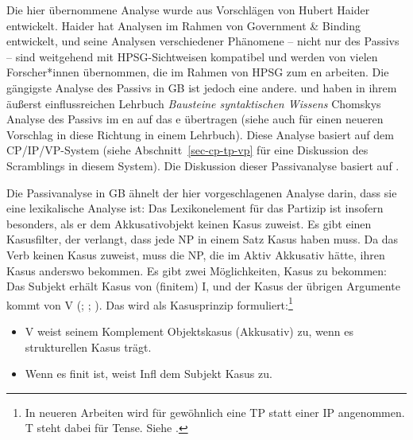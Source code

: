 Die hier übernommene Analyse wurde aus Vorschlägen von Hubert Haider
\citeyearpar{Haider86} entwickelt. Haider hat Analysen im Rahmen von Government \& Binding
\citep{Chomsky81a} entwickelt, und seine Analysen verschiedener Phänomene -- nicht nur des Passivs -- sind weitgehend mit HPSG-Sichtweisen kompatibel und werden
von vielen Forscher*innen übernommen, die im Rahmen von HPSG zum en arbeiten. Die gängigste Analyse des
Passivs in GB ist jedoch eine andere. \textcites[155--157]{Grewendorf88a}[]{Grewendorf93} und
\citet[462--463]{SS88a} haben in ihrem äußerst einflussreichen Lehrbuch \emph{Bausteine syntaktischen Wissens} Chomskys Analyse des Passivs im
en \citep[]{Chomsky81a} auf das e übertragen (siehe auch \citealt[]{Lohnstein2014a} für einen
neueren Vorschlag in diese Richtung in einem Lehrbuch). Diese Analyse basiert auf dem CP/IP/VP-System (siehe Abschnitt~\ref{sec-cp-tp-vp} für eine Diskussion des
Scramblings in diesem System). Die Diskussion dieser Passivanalyse basiert auf .

Die Passivanalyse in GB ähnelt der hier vorgeschlagenen Analyse darin, dass sie eine lexikalische Analyse ist:
Das Lexikonelement für das Partizip ist insofern besonders, als er dem Akkusativobjekt keinen Kasus zuweist. Es
gibt einen Kasusfilter, der verlangt, dass jede NP in einem Satz Kasus haben muss. Da das Verb keinen
Kasus zuweist, muss die NP, die im Aktiv Akkusativ hätte, ihren Kasus anderswo bekommen. Es gibt zwei
Möglichkeiten, Kasus zu bekommen: Das Subjekt erhält Kasus von (finitem) I, und
der Kasus der übrigen Argumente kommt von V (\citealp[]{Chomsky81a}; \citealp[]{Haider84b}; \citealp[--73]{FF87a}). Das wird als Kasusprinzip formuliert:\footnote{%
In neueren Arbeiten wird für gewöhnlich eine TP statt einer IP angenommen. T steht dabei für Tense. Siehe \zB {}.
}
\begin{principle-break}[Kasusprinzip]\label{Kasusprinzip-GB}
\begin{itemize}
\item V weist seinem Komplement Objektskasus (Akkusativ) zu, wenn es strukturellen Kasus trägt.
\item Wenn es finit ist, weist Infl dem Subjekt Kasus zu.
\end{itemize}
\end{principle-break}

